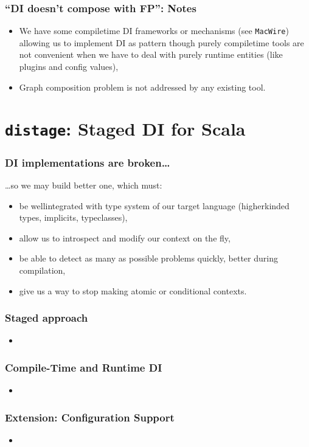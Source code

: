 \documentclass[usenames,dvipsnames]{beamer}
\newcommand{\distage}{\texttt{distage}\xspace}
\begin{document}
\begin{frame}
\frametitle{``DI doesn't compose with FP'': Notes}
\begin{itemize}
\item We have some compile\-time DI frameworks or mechanisms (see \texttt{MacWire}) allowing us to implement DI as pattern 
      though purely compile\-time tools are not convenient when we have to deal with purely runtime entities 
      (like plugins and config values),
\item Graph composition problem is not addressed by any existing tool.
\end{itemize}
\end{frame}

\section{\distage: Staged DI for Scala}

\begin{frame}
\frametitle{DI implementations are broken\dots}
\dots so we may build better one, which must:
\begin{itemize}
\item be well\-integrated with type system of our target language (higher\-kinded types, implicits, typeclasses),
\item allow us to introspect and modify our context on the fly,
\item be able to detect as many as possible problems quickly, better during compilation,
\item give us a way to stop making atomic or conditional contexts.
\end{itemize}
\end{frame}

\begin{frame}
\frametitle{Staged approach}
\begin{itemize}
\item 
\end{itemize}
\end{frame}

\begin{frame}
\frametitle{Compile-Time and Runtime DI}
\begin{itemize}
\item 
\end{itemize}
\end{frame}

\begin{frame}
\frametitle{Extension: Configuration Support}
\begin{itemize}
\item 
\end{itemize}
\end{frame}
\end{document}
